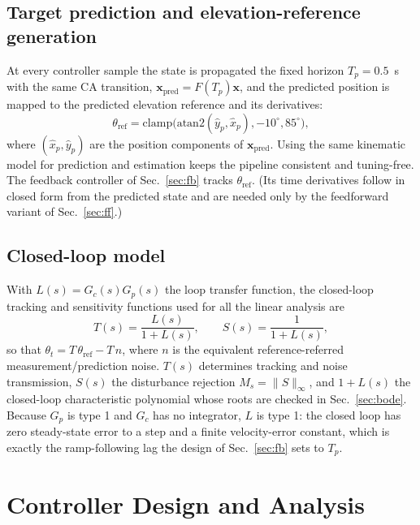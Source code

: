 \documentclass[conference]{IEEEtran}
\begin{document}
\subsection{Target prediction and elevation-reference generation}\label{sec:pred}
At every controller sample the state is propagated the fixed horizon $T_p=0.5$~s with the same CA transition, $\mathbf{x}_{\mathrm{pred}}=F(T_p)\mathbf{x}$, and the predicted position is mapped to the predicted elevation reference and its derivatives:
\begin{equation}
\theta_{\mathrm{ref}}=\mathrm{clamp}\big(\mathrm{atan2}(\hat y_p,\hat x_p),-10^\circ,85^\circ\big),
\label{eq:ref}
\end{equation}
where $(\hat x_p,\hat y_p)$ are the position components of $\mathbf{x}_{\mathrm{pred}}$. Using the same kinematic model for prediction and estimation keeps the pipeline consistent and tuning-free. The feedback controller of Sec.~\ref{sec:fb} tracks $\theta_{\mathrm{ref}}$. (Its time derivatives follow in closed form from the predicted state and are needed only by the feedforward variant of Sec.~\ref{sec:ff}.)

\subsection{Closed-loop model}\label{sec:cl}
With $L(s)=G_c(s)G_p(s)$ the loop transfer function, the closed-loop tracking and sensitivity functions used for all the linear analysis are
\begin{equation}
T(s)=\frac{L(s)}{1+L(s)},\qquad S(s)=\frac{1}{1+L(s)},
\label{eq:cl}
\end{equation}
so that $\theta_t=T\,\theta_{\mathrm{ref}}-T\,n$,
where $n$ is the equivalent reference-referred measurement/prediction noise. $T(s)$ determines tracking and noise transmission, $S(s)$ the disturbance rejection $M_s=\|S\|_\infty$, and $1+L(s)$ the closed-loop characteristic polynomial whose roots are checked in Sec.~\ref{sec:bode}. Because $G_p$ is type 1 and $G_c$ has no integrator, $L$ is type 1: the closed loop has zero steady-state error to a step and a finite velocity-error constant, which is exactly the ramp-following lag the design of Sec.~\ref{sec:fb} sets to $T_p$.

\section{Controller Design and Analysis}\label{sec:ctrl}
\end{document}
